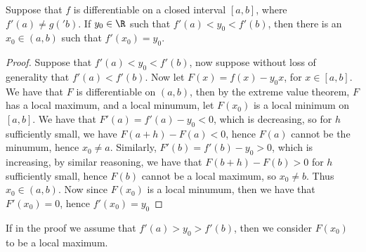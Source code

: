 \begin{theorem}\label{4.4.5}
    Suppose that $f$ is differentiable on a closed interval  $[a,b]$, where  $f'(a) \neq g('b)$. If  $y_0 \in \R$ such that $f'(a)<y_0<f'(b)$, then there is an $x_0 \in (a,b)$ such that $f'(x_0)=y_0$.
\end{theorem}
\begin{proof}
    Suppose that $f'(a)<y_0<f'(b)$, now suppose without loss of generality that $f'(a)<f'(b)$. Now let $F(x)=f(x)-y_0x$, for $x \in [a,b]$. We have that $F$ is differentiable on  $(a,b)$, then by the extreme value theorem, $F$ has a local maximum, and a local minumum, let  $F(x_0)$ is a local minimum on $[a,b]$. We have that  $F'(a)=f'(a)-y_0<0$, which is decreasing, so for $h$ sufficiently small, we have  $F(a+h)-F(a)<0$, hence  $F(a)$ cannot be the minumum, hence  $x_0 \neq a$. Similarly,
    $F'(b)=f'(b)-y_0>0$, which is increasing, by similar reasoning, we have that $F(b+h)-F(b)>0$ for  $h$ sufficiently small, hence $F(b)$ cannot be a local maximum, so  $x_0 \neq b$. Thus $x_0 \in (a,b)$. Now since $F(x_0)$ is a local minumum, then we have that $F'(x_0)=0$, hence $f'(x_0)=y_0$
\end{proof}
\begin{remark}
    If in the proof we assume that $f'(a)>y_0>f'(b)$, then we consider $F(x_0)$ to be a local maximum.
\end{remark}
